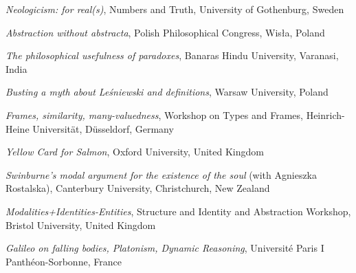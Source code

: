 \documentclass[10pt, a4paper]{article}
\newcommand{\years}[1]{\marginnote{\normalsize #1}}
\begin{document}
\emph{Neologicism: for real(s)}, Numbers and Truth, University of Gothenburg, Sweden



\vspace{0.5mm}

 \emph{Abstraction without abstracta}, Polish Philosophical Congress, Wis{\l}a, Poland


\vspace{0.5mm}


\emph{The philosophical usefulness of paradoxes},  Banaras Hindu University, Varanasi, India



\vspace{0.5mm}

 \emph{Busting a myth about Le\' sniewski and definitions},  Warsaw University, Poland


\vspace{0.5mm}





\years{2010} \emph{Frames, similarity, many-valuedness}, Workshop on Types and Frames,    Heinrich-Heine Universit\"at, D\"usseldorf, Germany



\vspace{0.5mm}


\emph{Yellow Card for Salmon},   Oxford University, United Kingdom


\vspace{0.5mm}


  \emph{Swinburne's modal argument for the existence of the soul} (with Agnieszka Rostalska),  Canterbury University, Christchurch, New Zealand



\vspace{0.5mm}



\years{2009} \emph{Modalities+Identities-Entities}, Structure and Identity and Abstraction Workshop,      Bristol University, United Kingdom



\vspace{0.5mm}

\emph{Galileo on falling bodies, Platonism, Dynamic Reasoning}, Universit\'e  Paris I Panth\'eon-Sorbonne, France





\vspace{0.5mm}
\end{document}
